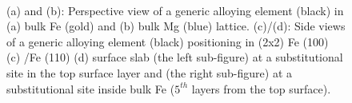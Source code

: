 \begingroup
\begin{figure}[ht]
  \centering
  \label{Chap:Mg_H:fig:2a}
  \label{Chap:Mg_H:fig:2b}\\
  \label{Chap:Mg_H:fig:2c}
  \label{Chap:Mg_H:fig:2d}
\caption[Perspective and side views of a generic alloying element in the simulation]{(a) and (b): Perspective view of a generic alloying element (black) in (a) bulk Fe (gold) and (b) bulk Mg (blue) lattice. (c)/(d): Side views of a generic alloying element (black) positioning in (2x2) Fe (100) (c) /Fe (110) (d) surface slab (the left sub-figure) at a substitutional site in the top surface layer and (the right sub-figure) at a substitutional site inside bulk Fe ($5^{th}$ layers from the top surface).}
  \label{Chap:Mg_H:fig2}
\end{figure}
\endgroup

